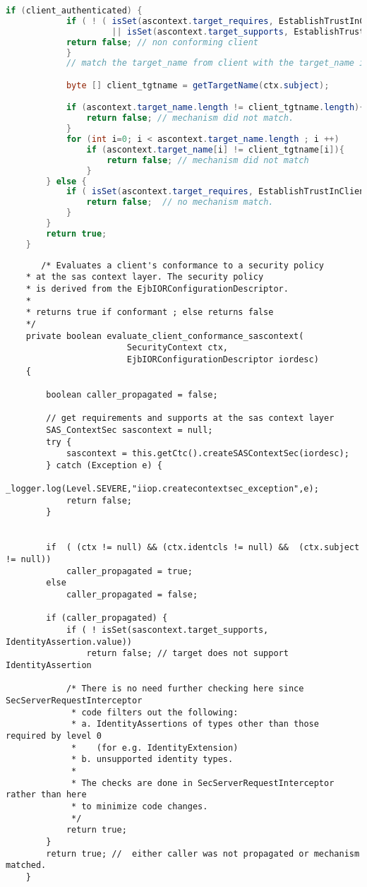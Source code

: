 \begin{lstlisting}[language=Java]
        if (client_authenticated) {
            if ( ! ( isSet(ascontext.target_requires, EstablishTrustInClient.value)
                     || isSet(ascontext.target_supports, EstablishTrustInClient.value))){
            return false; // non conforming client
            }
            // match the target_name from client with the target_name in policy 

            byte [] client_tgtname = getTargetName(ctx.subject);

            if (ascontext.target_name.length != client_tgtname.length){
                return false; // mechanism did not match.
            }            
            for (int i=0; i < ascontext.target_name.length ; i ++)
                if (ascontext.target_name[i] != client_tgtname[i]){
                    return false; // mechanism did not match
                }
        } else { 
            if ( isSet(ascontext.target_requires, EstablishTrustInClient.value)){
                return false;  // no mechanism match.
            }
        }
        return true;
    }	
\end{lstlisting}

\begin{lstlisting}
	   /* Evaluates a client's conformance to a security policy
    * at the sas context layer. The security policy
    * is derived from the EjbIORConfigurationDescriptor.
    *
    * returns true if conformant ; else returns false
    */
    private boolean evaluate_client_conformance_sascontext(
                        SecurityContext ctx,
                        EjbIORConfigurationDescriptor iordesc)
    {

        boolean caller_propagated = false;

        // get requirements and supports at the sas context layer
        SAS_ContextSec sascontext = null;
        try {
            sascontext = this.getCtc().createSASContextSec(iordesc);
        } catch (Exception e) {
            _logger.log(Level.SEVERE,"iiop.createcontextsec_exception",e);
            return false;
        }

            
        if  ( (ctx != null) && (ctx.identcls != null) &&  (ctx.subject != null))
            caller_propagated = true;
        else
            caller_propagated = false;

        if (caller_propagated) {
            if ( ! isSet(sascontext.target_supports, IdentityAssertion.value))
                return false; // target does not support IdentityAssertion

            /* There is no need further checking here since SecServerRequestInterceptor
             * code filters out the following:
             * a. IdentityAssertions of types other than those required by level 0 
             *    (for e.g. IdentityExtension)
             * b. unsupported identity types.
             * 
             * The checks are done in SecServerRequestInterceptor rather than here
             * to minimize code changes.
             */
            return true;
        }
        return true; //  either caller was not propagated or mechanism matched.
    }
\end{lstlisting}


